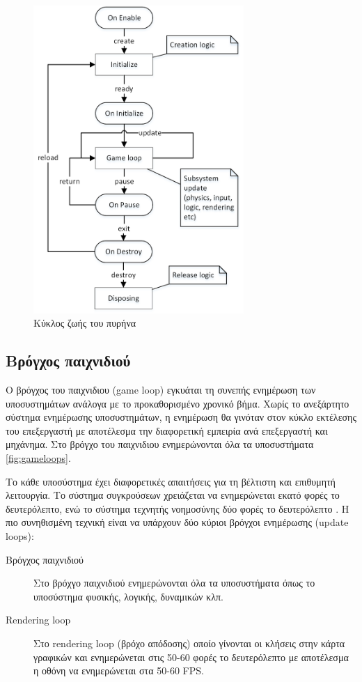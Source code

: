 	\begin{figure}[h!]
		\centering
		\includegraphics[width=80mm]{Images/core_lifecycle}
		\caption{Κύκλος ζωής του πυρήνα}
		\label{fig:corelifecycle}
	\end{figure}
		
	\subsection{Βρόγχος παιχνιδιού}
	Ο βρόγχος του παιχνιδιου (game loop) εγκυάται τη συνεπής ενημέρωση των υποσυστημάτων ανάλογα με το προκαθορισμένο χρονικό βήμα. Χωρίς το ανεξάρτητο σύστημα ενημέρωσης υποσυστημάτων, η ενημέρωση θα γινόταν στον κύκλο εκτέλεσης του επεξεργαστή με αποτέλεσμα την διαφορετική εμπειρία ανά επεξεργαστή και μηχάνημα. Στο βρόγχο του παιχνιδιου ενημερώνονται όλα τα υποσυστήματα \ref{fig:gameloops}.
	
	Το κάθε υποσύστημα έχει διαφορετικές απαιτήσεις για τη βέλτιστη και επιθυμητή λειτουργία. Το σύστημα συγκρούσεων χρειάζεται να ενημερώνεται εκατό φορές το δευτερόλεπτο, ενώ το σύστημα τεχνητής νοημοσύνης δύο φορές το δευτερόλεπτο \cite{gregory2009game}. Η πιο συνηθισμένη τεχνική είναι να υπάρχουν δύο κύριοι βρόγχοι ενημέρωσης (update loops):
	\begin{description}
	\item [Βρόγχος παιχνιδιού] Στο βρόχγο παιχνιδιού ενημερώνονται όλα τα υποσυστήματα όπως το υποσύστημα φυσικής, λογικής, δυναμικών κλπ.
	\item [Rendering loop] Στο rendering loop (βρόχο απόδοσης) οποίο γίνονται οι κλήσεις στην κάρτα γραφικών και ενημερώνεται στις 50-60 φορές το δευτερόλεπτο με αποτέλεσμα η οθόνη να ενημερώνεται στα 50-60 \gls{FPS}.
	\end{description}
	
